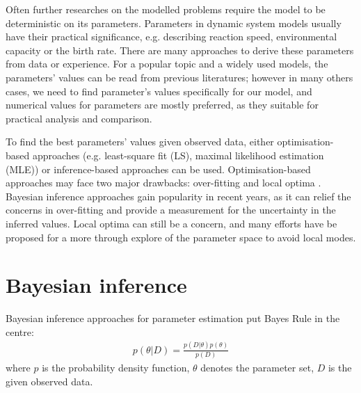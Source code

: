 Often further researches on the modelled problems require the model to be deterministic on its parameters. Parameters in dynamic system models usually have their practical significance, e.g. describing reaction speed, environmental capacity or the birth rate. There are many approaches to derive these parameters from data or experience. For a popular topic and a widely used models, the parameters' values can be read from previous literatures; however in many others cases, we need to find parameter's values specifically for our model, and numerical values for parameters are mostly preferred, as they suitable for practical analysis and comparison.

To find the best parameters' values given observed data, either optimisation-based approaches (e.g. least-square fit (LS), maximal likelihood estimation (MLE)) or inference-based approaches can be used. Optimisation-based approaches may face two major drawbacks: over-fitting and local optima \cite{ref:abcsysbio}. Bayesian inference approaches gain popularity in recent years, as it can relief the concerns in over-fitting and provide a measurement for the uncertainty in the inferred values. Local optima can still be a concern, and many efforts have be proposed for a more through explore of the parameter space to avoid local modes.



\section{Bayesian inference}





 Bayesian inference approaches for parameter estimation put Bayes Rule in the centre:
 \begin{align}
    \label{eq:bayes}
    p(\theta|D) = \frac{p(D|\theta)p(\theta)}{p(D)}
\end{align}
where $p$ is the probability density function, $\theta$ denotes the parameter set, $D$ is the given observed data.

